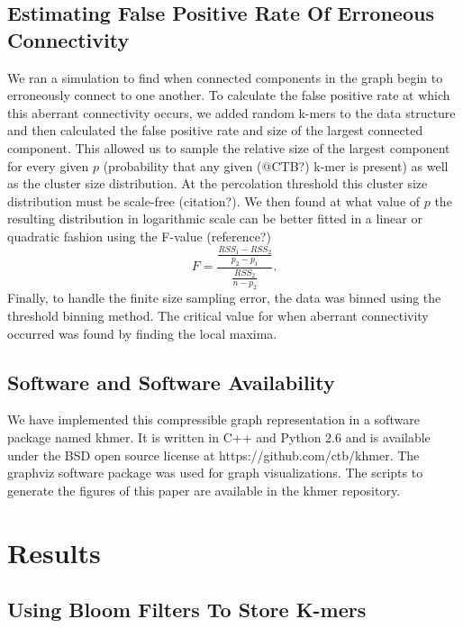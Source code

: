 \documentclass[12pt]{article} \usepackage{simplemargins}
\begin{document}
\subsection{Estimating False Positive Rate Of Erroneous Connectivity}
We ran a simulation to find when connected components in the graph 
begin to erroneously connect to one another.
To calculate the false positive rate at which this aberrant 
connectivity occurs, 
we added random k-mers to the data structure 
and then calculated the false positive rate and size of 
the largest connected 
component. This allowed us to sample the relative size of 
the largest component for every 
given $p$ (probability that any given (@CTB?) k-mer is present) as well as the cluster size distribution. 
At the percolation threshold this cluster size distribution must be scale-free (citation?). 
We then found at what value of $p$ the resulting 
distribution in logarithmic 
scale can be better fitted in a linear or quadratic fashion using 
the F-value (reference?)
\newline
\newline
\begin{displaymath}
F=\frac{\frac{RSS_1-RSS_2}{p_2-p_1}}{\frac{RSS_2}{n-p_2}}.
\end{displaymath}
Finally, to handle the finite size sampling error, the data was binned using the 
threshold binning method\cite{adami2002critical}. The critical value for 
when aberrant connectivity occurred was found by finding the local maxima.

\subsection{Software and Software Availability}
We have implemented this compressible graph representation in a software package
named khmer.
It is written in C++
and Python 2.6 and is available under the BSD open source license at
https://github.com/ctb/khmer.
The graphviz software 
package was used for graph visualizations. The scripts to 
generate the figures of this paper are available in the khmer repository.

\section{Results}

\subsection{Using Bloom Filters To Store K-mers}
\end{document}
